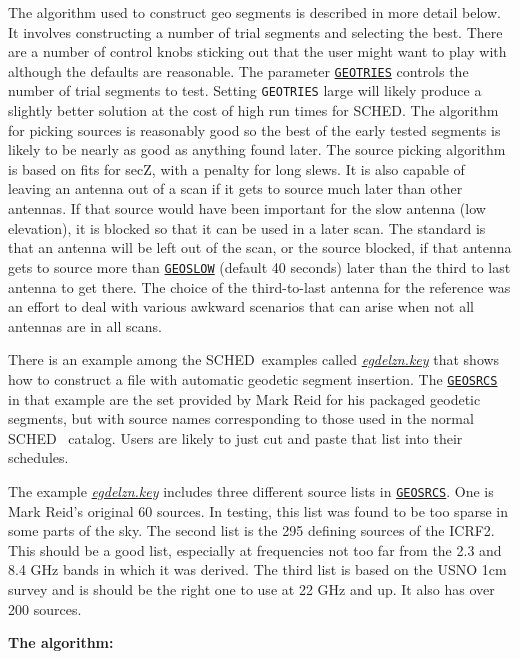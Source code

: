 \documentclass{report}
\newcommand{\sched}{{\sc SCHED}}
\newcommand{\schedb}{{\sc SCHED~}}
\begin{document}
The algorithm used to construct geo segments is described in more
detail below.  It involves constructing a number of trial segments and
selecting the best.  There are a number of control knobs sticking out
that the user might want to play with although the defaults are
reasonable.  The parameter 
{\hyperref[MP:GEOTRIES]{{\tt GEOTRIES}}}
controls the number of trial segments to test.  Setting {\tt GEOTRIES}
large will likely produce a slightly better solution at the cost of
high run times for \sched.  The algorithm for picking sources is
reasonably good so the best of the early tested segments is likely to
be nearly as good as anything found later.  The source picking
algorithm is based on fits for secZ, with a penalty for long slews.
It is also capable of leaving an antenna out of a scan if it gets to
source much later than other antennas.  If that source would have been
important for the slow antenna (low elevation), it is blocked so that
it can be used in a later scan.  The standard is that an antenna will
be left out of the scan, or the source blocked, if that antenna gets
to source more than 
{\hyperref[MP:GEOSLOW]{{\tt GEOSLOW}}} (default 40
seconds) later than the third to last antenna to get there.  The
choice of the third-to-last antenna for the reference was an effort to
deal with various awkward scenarios that can arise when not all
antennas are in all scans.

There is an example among the \schedb examples called
{\href{examples/egdelzn.key}{{\sl egdelzn.key}}} that shows
how to construct a file with automatic geodetic segment insertion.
The 
{\hyperref[MP:GEOSRCS]{{\tt GEOSRCS}}} in that example are the set
provided by Mark Reid for his packaged geodetic segments, but with
source names corresponding to those used in the normal \schedb
catalog.  Users are likely to just cut and paste that list into their
schedules.

The example 
{\href{examples/egdelzn.key}{{\sl egdelzn.key}}}
includes three different source lists in 
{\hyperref[MP:GEOSRCS]{{\tt GEOSRCS}}}.
One is Mark Reid's original 60 sources.  In testing, this list was found
to be too sparse in some parts of the sky.  The second list is the
295 defining sources of the ICRF2.  This should be a good list, especially
at frequencies not too far from the 2.3 and 8.4 GHz bands in which it
was derived.  The third list is based on the USNO 1cm survey and is
should be the right one to use at 22 GHz and up.  It also has over 200
sources.

{\bf The algorithm:}
\end{document}
